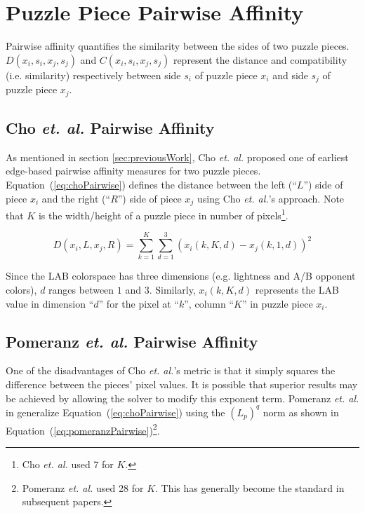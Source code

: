 \documentclass{report}
\def\eref#1{(\ref{#1})}
\begin{document}

\pagebreak
\section{Puzzle Piece Pairwise Affinity}\label{sec:piecePairwiseAffinity}

Pairwise affinity quantifies the similarity between the sides of two puzzle pieces.  $D(x_i, s_i, x_j, s_j)$ and $C(x_i, s_i, x_j, s_j)$ represent the distance and compatibility (i.e. similarity) respectively between side $s_i$ of puzzle piece $x_i$ and side $s_j$ of puzzle piece $x_j$.  

\subsection{Cho \textit{et. al.} Pairwise Affinity}\label{sec:choPairwiseAffinity}

As mentioned in section \ref{sec:previousWork}, Cho \textit{et. al.} \cite{cho2010} proposed one of earliest edge-based pairwise affinity measures for two puzzle pieces.  Equation~\eref{eq:choPairwise} defines the distance between the left (``$L$'') side of piece $x_i$ and the right (``$R$'') side of piece $x_j$ using Cho \textit{et. al.}'s approach.  Note that $K$ is the width/height of a puzzle piece in number of pixels\footnote{Cho \textit{et. al.} used 7 for $K$.}.  

\begin{equation} \label{eq:choPairwise}
D(x_i,L,x_j,R) = \sum_{k=1}^{K}\sum_{d=1}^{3}(x_i(k,K,d) - x_j(k,1,d))^2
\end{equation}

Since the LAB colorspace has three dimensions (e.g. lightness and A/B opponent colors), $d$ ranges between $1$ and $3$.  Similarly, $x_i(k,K,d)$ represents the LAB value in dimension ``$d$'' for the pixel at ``$k$'', column ``$K$'' in puzzle piece $x_i$.

\subsection{Pomeranz \textit{et. al.} Pairwise Affinity}\label{sec:pomeranzPairwiseAffinity}

One of the disadvantages of Cho \textit{et. al.}'s metric is that it simply squares the difference between the pieces' pixel values.  It is possible that superior results may be achieved by allowing the solver to modify this exponent term.  Pomeranz \textit{et. al.} in \cite{pomeranz2011} generalize Equation~\eref{eq:choPairwise} using the $(L_p)^q$ norm as shown in Equation~\eref{eq:pomeranzPairwise}\footnote{Pomeranz \textit{et. al.} used 28 for $K$.  This has generally become the standard in subsequent papers.}.
\end{document}

